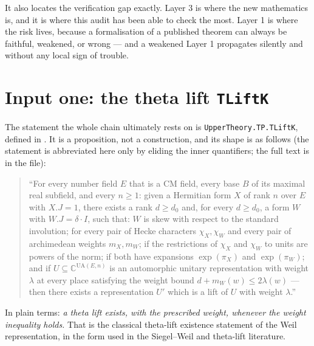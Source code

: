It also locates the verification gap exactly. Layer 3 is where the new
mathematics is, and it is where this audit has been able to check the most.
Layer 1 is where the risk lives, because a formalisation of a published
theorem can always be faithful, weakened, or wrong --- and a weakened Layer 1
propagates silently and without any local sign of trouble.

\section{Input one: the theta lift \texttt{TLiftK}}The statement the whole chain ultimately rests on is
\texttt{UpperTheory.TP.TLiftK}, defined in
. It is a
proposition, not a construction, and its shape is as follows (the statement is
abbreviated here only by eliding the inner quantifiers; the full text is in
the file):

\begin{quote}
``For every number field $E$ that is a CM field, every base $B$ of its maximal
real subfield, and every $n \ge 1$: given a Hermitian form $X$ of rank $n$
over $E$ with $X.J = 1$, there exists a rank $d \ge d_0$ and, for every $d
\ge d_0$, a form $W$ with $W.J = \delta \cdot I$, such that: $W$ is skew with
respect to the standard involution; for every pair of Hecke characters
$\chi_X, \chi_W$ and every pair of archimedean weights $m_X, m_W$; if the
restrictions of $\chi_X$ and $\chi_W$ to units are powers of the norm; if both
have expansions $\exp(\pi_X)$ and $\exp(\pi_W)$; and if $U \subseteq
\mathbb{C}^{\mathrm{UA}(E,n)}$ is an automorphic unitary representation with
weight $\lambda$ at every place satisfying the weight bound $d + m_W(w) \le
2\lambda(w)$ --- then there exists a representation $U'$ which is a lift of
$U$ with weight $\lambda$.''
\end{quote}

In plain terms: \emph{a theta lift exists, with the prescribed weight,
whenever the weight inequality holds.} That is the classical theta-lift
existence statement of the Weil representation, in the form used in the
Siegel--Weil and theta-lift literature.

